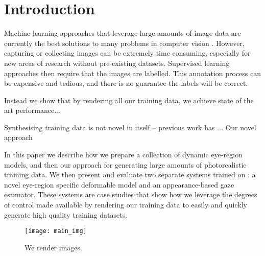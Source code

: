 
\section{Introduction}

Machine learning approaches that leverage large amounts of image data are currently the best solutions to many problems in computer vision . However, capturing or collecting images can be extremely time consuming, especially for new areas of research without pre-existing datasets. Supervised learning approaches then require that the images are labelled. This annotation process can be expensive and tedious, and there is no guarantee the labels will be correct.

Instead we show that by rendering all our training data, we achieve state of the art performance...

Synthesising training data is not novel in itself -- previous work has ... Our novel approach 

In this paper we describe how we prepare a collection of dynamic eye-region models, and then our approach for generating large amounts of photorealistic training data. We then present and evaluate two separate systems trained on \dataset: a novel eye-region specific deformable model and an appearance-based gaze estimator.
%
These systems are case studies that show how we leverage the degrees of control made available by rendering our training data to easily and quickly generate high quality training datasets.

\begin{figure}
    \texttt{[image: main\_img]}
    \caption{We render images.}
\end{figure}

